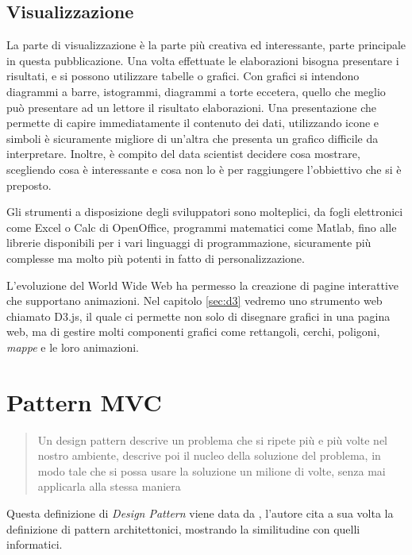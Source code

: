 \subsection{Visualizzazione}\label{sec:visualizzazione}
La parte di visualizzazione è la parte più creativa ed interessante, parte principale in questa pubblicazione. Una volta effettuate le elaborazioni bisogna presentare i risultati, e si possono utilizzare tabelle o grafici. Con grafici si intendono diagrammi a barre, istogrammi, diagrammi a torte eccetera, quello che meglio può presentare ad un lettore il risultato elaborazioni. Una presentazione che permette di capire immediatamente il contenuto dei dati, utilizzando icone e simboli è sicuramente migliore di un'altra che presenta un grafico difficile da interpretare. Inoltre, è compito del data scientist decidere cosa mostrare, scegliendo cosa è interessante e cosa non lo è per raggiungere l'obbiettivo che si è preposto.

Gli strumenti a disposizione degli sviluppatori sono molteplici, da fogli elettronici come Excel o Calc di OpenOffice, programmi matematici come Matlab, fino alle librerie disponibili per i vari linguaggi di programmazione, sicuramente più complesse ma molto più potenti in fatto di personalizzazione. 

L'evoluzione del World Wide Web ha permesso la creazione di pagine interattive che supportano animazioni. Nel capitolo \ref{sec:d3} vedremo uno strumento web chiamato D3.js, il quale ci permette non solo di disegnare grafici in una pagina web, ma di gestire molti componenti grafici come rettangoli, cerchi, poligoni, \emph{mappe} e le loro animazioni.






\section{Pattern MVC}\label{sec:mvc}
\begin{quote}Un design pattern  descrive un problema che si ripete più e più volte nel nostro ambiente, descrive poi il nucleo della soluzione del problema, in modo tale che si possa usare la soluzione un milione di volte, senza mai applicarla alla stessa maniera\end{quote}

Questa definizione di \emph{Design Pattern} viene data da \cite[p. 2,3]{designpatterns}, l'autore cita a sua volta la definizione di pattern architettonici, mostrando la similitudine con quelli informatici.

